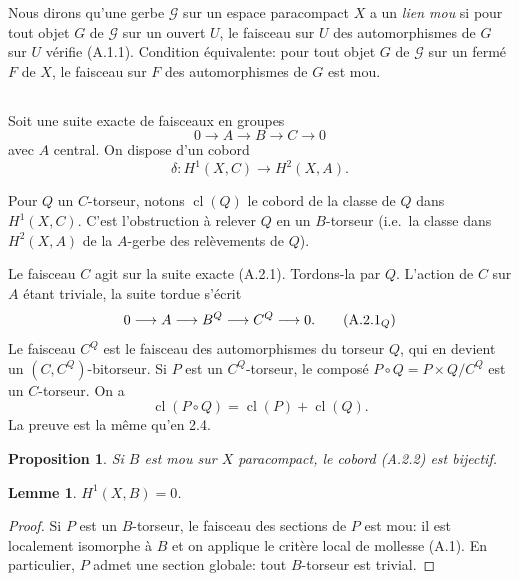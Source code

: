 \documentclass[11pt,a4paper]{article}
\theoremstyle{plain}
\newtheorem{lemma}[theorem]{Lemme}
\newtheorem{proposition}[theorem]{Proposition}
\theoremstyle{definition}
\DeclareMathOperator{\cl}{cl}
\begin{document}
Nous dirons qu'une gerbe $\mathcal{G}$ sur un espace paracompact $X$ a un \emph{lien mou} si
pour tout objet $G$ de $\mathcal{G}$ sur un ouvert $U$, le faisceau sur $U$ des automorphismes de
$G$ sur $U$ v\'erifie (A.1.1). Condition \'equivalente: pour tout objet $G$ de $\mathcal{G}$ sur un ferm\'e
$F$ de $X$, le faisceau sur $F$ des automorphismes de $G$ est mou.

\subsection{}
Soit une suite exacte de faisceaux en groupes
\begin{equation}
0 \longrightarrow A \longrightarrow B \longrightarrow C \longrightarrow 0 \tag{A.2.1}
\end{equation}
avec $A$ central. On dispose d'un cobord
\begin{equation}
\delta: H^{1}(X, C) \longrightarrow H^{2}(X, A). \tag{A.2.2}
\end{equation}

Pour $Q$ un $C$-torseur, notons $\cl(Q)$ le cobord de la classe de $Q$ dans $H^{1}(X,C)$. C'est l'obstruction \`a relever $Q$ en un $B$-torseur (i.e.\ la classe dans $H^{2}(X, A)$ de la $A$-gerbe des rel\`evements de $Q$).

Le faisceau $C$ agit sur la suite exacte (A.2.1). Tordons-la par $Q$. L'action de $C$
sur $A$ \'etant triviale, la suite tordue s'\'ecrit
\begin{equation}
0 \longrightarrow A \longrightarrow B^{Q} \longrightarrow C^{Q} \longrightarrow 0. \tag{A.2.1$_{Q}$}
\end{equation}
Le faisceau $C^{Q}$ est le faisceau des automorphismes du torseur $Q$, qui en devient un $(C, C^{Q})$-bitorseur. Si $P$ est un $C^{Q}$-torseur, le compos\'e $P \circ Q = P \times Q/C^{Q}$ est un
$C$-torseur. On a
\begin{equation}
\cl(P \circ Q) = \cl(P) + \cl(Q). \tag{A.2.3}
\end{equation}
La preuve est la m\^eme qu'en 2.4.

\begin{proposition}
Si $B$ est mou sur $X$ paracompact, le cobord (A.2.2) est bijectif.
\end{proposition}

\begin{lemma}
$H^{1}(X, B) = 0$.
\end{lemma}

\begin{proof}
Si $P$ est un $B$-torseur, le faisceau des sections de $P$ est mou: il est localement
isomorphe \`a $B$ et on applique le crit\`ere local de mollesse (A.1). En particulier, $P$
admet une section globale: tout $B$-torseur est trivial.
\end{proof}
\end{document}
